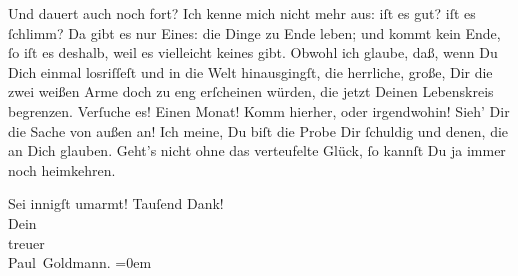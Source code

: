 \pstart
           Und \label{K_L02699-5v}\label{K_L02699-5} dauert auch noch
               fort? Ich kenne mich nicht mehr aus: iſt es gut? iſt es{ }ſchlimm? Da gibt es nur
               Eines: die Dinge zu Ende leben; und  kommt kein
               Ende,{ }ſo iſt es deshalb, weil es vielleicht keines gibt. Obwohl ich glaube, daß, wenn
               Du Dich einmal losriſſeſt und in die Welt hinausgingſt, die herrliche, große, Dir die
               zwei weißen Arme doch zu eng
               erſcheinen würden, die jetzt Deinen {\pb}Lebenskreis
               begrenzen. Verſuche es! Einen Monat! Komm hierher, oder irgendwohin! Sieh’ Dir die
                  Sache von außen an! Ich
               meine, Du biſt die Probe Dir{ }ſchuldig und denen, die an Dich glauben. Geht’s
                  nicht\strikeout{,} ohne das verteufelte Glück,{ }ſo kannſt Du ja immer noch
               heimkehren.\pend
           
\pstart
           Sei innigſt umarmt! Tauſend Dank! {\\[\baselineskip]}Dein{\\[\baselineskip]}treuer{\\[\baselineskip]}\spacefill\mbox{Paul Goldmann.}\pend
           \leftskip=0em{}\endnumbering{}  \newcommand{\dateiname}{L02699}\newcommand{\titel}{Paul Goldmann an Arthur Schnitzler, 27. 6. [1892]}\newcommand{\editorInnen}{Martin Anton Müller und Laura Untner}
